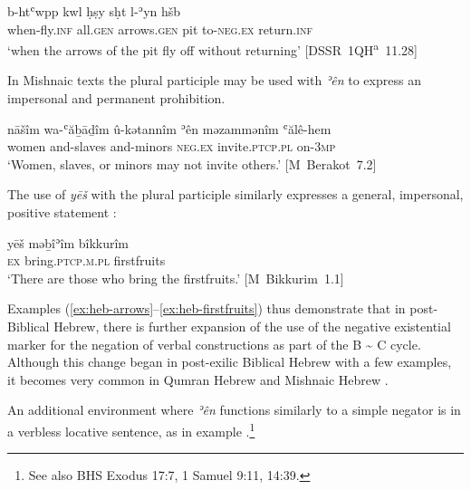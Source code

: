 \documentclass[output=paper,colorlinks,citecolor=brown,draft,draftmode]{langscibook}
\begin{document}
%
\begin{exe}\ex \label{ex:heb-arrows}
    \gll b-htʿwpp kwl ḥṣy sḥt l-ʾyn hšb  \\
  when-fly.\textsc{inf}     all.\textsc{gen}   arrows.\textsc{gen}   pit to-\textsc{neg.ex}   return.\textsc{inf} \\
    \glt `when the arrows of the pit fly off without returning'
    \mbox{[DSSR 1QH\textsuperscript{a} 11.28]}
    \end{exe}
%
In Mishnaic texts the plural participle may be used with \textit{ʾên} to express an impersonal and permanent prohibition. 
%
\begin{exe}\ex \label{ex:heb-women}
    \gll nāšîm wa-ʿăḇāḏîm û-kǝtannîm ʾên məzammənîm ʿălê-hem \\
  women   and-slaves   and-minors \textsc{neg.ex}   invite.\textsc{ptcp.pl}
  on-\textsc{3mp}\\
    \glt `Women, slaves, or minors may not invite others.'
    \mbox{[M Berakot 7.2]}
    \end{exe}
%
The use of \textit{yēš} with the plural participle similarly expresses a
general, impersonal, positive statement \parencite[134]{Perez1997}:
%
\begin{exe}\ex \label{ex:heb-firstfruits}
    \gll  yēš məḇîʾîm bîkkurîm\\
\textsc{ex}       bring.\textsc{ptcp.m.pl}     firstfruits \\
    \glt `There are those who bring the firstfruits.'
    \mbox{[M Bikkurim 1.1]}
    \end{exe}
%
Examples (\ref{ex:heb-arrows}--\ref{ex:heb-firstfruits}) thus demonstrate that in post-Biblical
Hebrew, there is further expansion of the use of the negative existential
marker for the negation of verbal constructions as part of the B
{\textasciitilde} C cycle. Although this change began in post-exilic
Biblical Hebrew with a few examples, it becomes very common in Qumran
Hebrew and Mishnaic Hebrew \parencite[36--39]{Hurvitz2014}.

An additional environment where \textit{ʾên} functions similarly to a
simple negator is in a verbless locative sentence, as in example
.\footnote{See also BHS Exodus 17:7, 1 Samuel 9:11, 14:39.}
%
\end{document}
